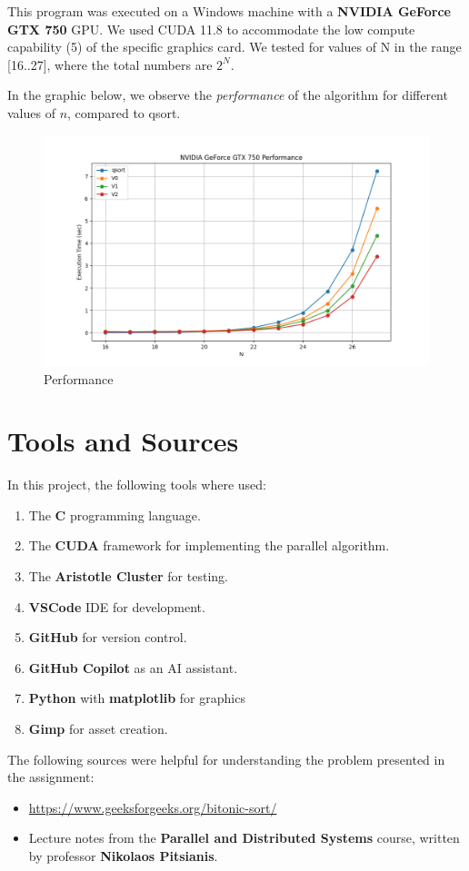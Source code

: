 \documentclass[12pt]{report}
\begin{document}
This program was executed on a Windows machine with a \textbf{NVIDIA GeForce GTX 750} GPU. We used CUDA 11.8 to accommodate the low compute capability (5) of the specific graphics card. We tested for values of N in the range [16..27], where the total numbers are $2^N$. \newpage

In the graphic below, we observe the \textit{performance} of the algorithm for different values of $n$, compared to qsort. 

\begin{figure}[H]
    \centering
    \includegraphics[width=1\linewidth]{assets/GTX750.png}
    \caption{Performance}
    \label{fig:enter-label}
\end{figure}

\chapter{Tools and Sources}

In this project, the following tools where used:
\begin{enumerate}
    \item The \textbf{C} programming language.
    \item The \textbf{CUDA} framework for implementing the parallel algorithm.
    \item The \textbf{Aristotle Cluster} for testing.
    \item \textbf{VSCode} IDE for development.
    \item \textbf{GitHub} for version control.
    \item \textbf{GitHub Copilot} as an AI assistant.
    \item \textbf{Python} with \textbf{matplotlib} for graphics
    \item \textbf{Gimp} for asset creation.
\end{enumerate}

The following sources were helpful for understanding the problem presented in the assignment:
\begin{itemize}
    \item \url{https://www.geeksforgeeks.org/bitonic-sort/}
    \item Lecture notes from the \textbf{Parallel and Distributed Systems} course, written by professor \textbf{Nikolaos Pitsianis}.
\end{itemize}
\end{document}

